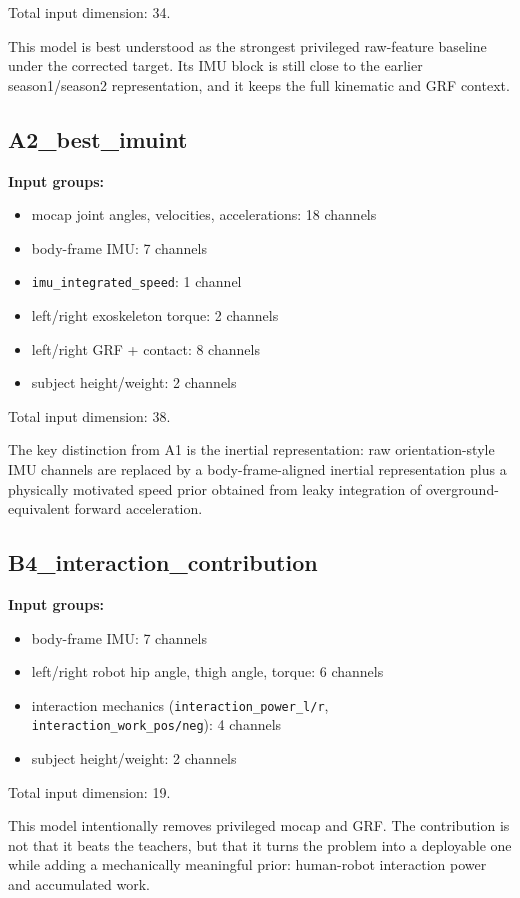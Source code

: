 \documentclass[11pt,a4paper]{article}
\begin{document}
Total input dimension: 34.

This model is best understood as the strongest privileged raw-feature baseline under the corrected target.
Its IMU block is still close to the earlier season1/season2 representation, and it keeps the full kinematic and GRF context.

\subsection{A2\_best\_imuint}

\textbf{Input groups:}
\begin{itemize}
\item mocap joint angles, velocities, accelerations: 18 channels
\item body-frame IMU: 7 channels
\item \texttt{imu\_integrated\_speed}: 1 channel
\item left/right exoskeleton torque: 2 channels
\item left/right GRF + contact: 8 channels
\item subject height/weight: 2 channels
\end{itemize}

Total input dimension: 38.

The key distinction from A1 is the inertial representation:
raw orientation-style IMU channels are replaced by a body-frame-aligned inertial representation plus a physically motivated speed prior obtained from leaky integration of overground-equivalent forward acceleration.

\subsection{B4\_interaction\_contribution}

\textbf{Input groups:}
\begin{itemize}
\item body-frame IMU: 7 channels
\item left/right robot hip angle, thigh angle, torque: 6 channels
\item interaction mechanics (\texttt{interaction\_power\_l/r}, \texttt{interaction\_work\_pos/neg}): 4 channels
\item subject height/weight: 2 channels
\end{itemize}

Total input dimension: 19.

This model intentionally removes privileged mocap and GRF. The contribution is not that it beats the teachers, but that it turns the problem into a deployable one while adding a mechanically meaningful prior: human-robot interaction power and accumulated work.
\end{document}
